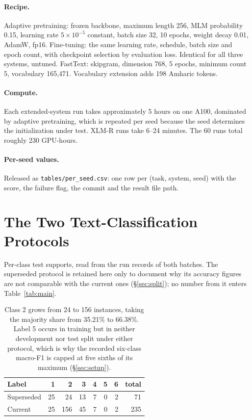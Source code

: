 \documentclass[11pt]{article}
\begin{document}
\paragraph{Recipe.} Adaptive pretraining: frozen backbone, maximum length
256, MLM probability 0.15, learning rate $5\times10^{-5}$ constant, batch
size 32, 10 epochs, weight decay 0.01, AdamW, fp16. Fine-tuning: the same
learning rate, schedule, batch size and epoch count, with checkpoint
selection by evaluation loss. Identical for all three systems, untuned.
FastText: skipgram, dimension 768, 5 epochs, minimum count 5, vocabulary
165{,}471. Vocabulary extension adds 198 Amharic tokens.

\paragraph{Compute.} Each extended-system run takes approximately 5 hours on
one A100, dominated by adaptive pretraining, which is repeated per seed
because the seed determines the initialization under test. XLM-R runs take
6--24 minutes. The 60 runs total roughly 230 GPU-hours.

\paragraph{Per-seed values.} Released as \texttt{tables/per\_seed.csv}: one
row per (task, system, seed) with the score, the failure flag, the commit and
the result file path.

\section{The Two Text-Classification Protocols}
\label{app:tcsplit}

Per-class test supports, read from the run records of both batches. The
superseded protocol is retained here only to document why its accuracy
figures are not comparable with the current ones (\S\ref{sec:split}); no
number from it enters Table~\ref{tab:main}.

\begin{table}[h]
\centering
\small
\begin{tabular}{lrrrrrrr}
\toprule
Label & 1 & 2 & 3 & 4 & 5 & 6 & total \\
\midrule
Superseded & 25 & 24 & 13 & 7 & 0 & 2 & 71 \\
Current    & 25 & 156 & 45 & 7 & 0 & 2 & 235 \\
\bottomrule
\end{tabular}
\caption{Class 2 grows from 24 to 156 instances, taking the majority share
from 35.21\% to 66.38\%. Label 5 occurs in training but in neither
development nor test split under either protocol, which is why the recorded
six-class macro-F1 is capped at five sixths of its maximum
(\S\ref{sec:setup}).}
\end{table}
\end{document}
